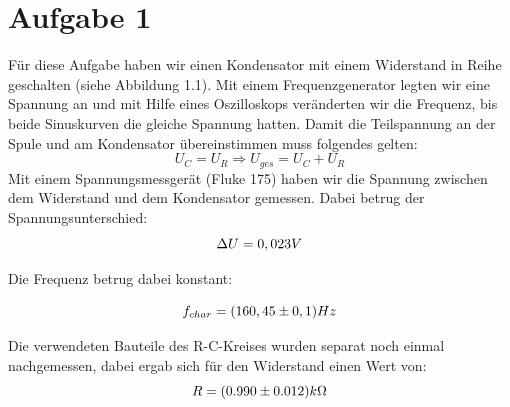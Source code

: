 \section{Aufgabe 1}
\begin{center}
\begin{minipage}{\linewidth}
\centering
{}
%
\label{schaltplan_nr1}
\end{minipage}
\end{center}

Für diese Aufgabe haben wir einen Kondensator mit einem Widerstand in Reihe geschalten (siehe Abbildung 1.1). Mit einem Frequenzgenerator legten wir eine Spannung an und mit Hilfe eines Oszilloskops veränderten wir die Frequenz, bis beide Sinuskurven die gleiche Spannung hatten. 
Damit die Teilspannung an der Spule und am Kondensator übereinstimmen muss folgendes gelten:
\begin{equation}
U_C = U_R 	\Rightarrow	 U_{ges} = U_C + U_R
\end{equation}
Mit einem Spannungsmessgerät (Fluke 175) haben wir die Spannung zwischen dem Widerstand und dem Kondensator gemessen. Dabei betrug der Spannungsunterschied:
\begin{equation}
\notag
\Delta U=0,023 V
\end{equation}

Die Frequenz betrug dabei konstant:

\begin{equation}\notag
f_{char} = (160,45\pm 0,1) Hz
\end{equation}

Die verwendeten Bauteile des R-C-Kreises wurden separat noch einmal nachgemessen, dabei ergab sich für den Widerstand einen Wert von:
\begin{equation}\notag
R = (0.990 \pm 0.012)k\Omega
\end{equation}

